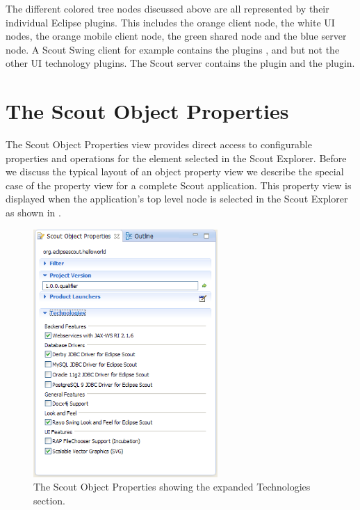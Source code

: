 \documentclass[a4paper,10pt,twoside]{book}
\begin{document}
The different colored tree nodes discussed above are all represented by their individual Eclipse plugins. 
This includes the orange client node, the white UI nodes, the orange mobile client node, the green shared node and the blue server node. 
A Scout Swing client for example contains the plugins ,  and  but not the other UI technology plugins. 
The Scout server contains the  plugin and the  plugin. 

\section{The Scout Object Properties}

The Scout Object Properties view provides direct access to configurable properties and operations for the element selected in the Scout Explorer.
Before we discuss the typical layout of an object property view we describe the special case of the property view for a complete Scout application. 
This property view is displayed when the application's top level node is selected in the Scout Explorer as shown in . 

\begin{figure}
\includegraphics[width=7cm]{properties_technologies.png}
\caption{The Scout Object Properties showing the expanded Technologies section.}
\end{figure}
\end{document}
